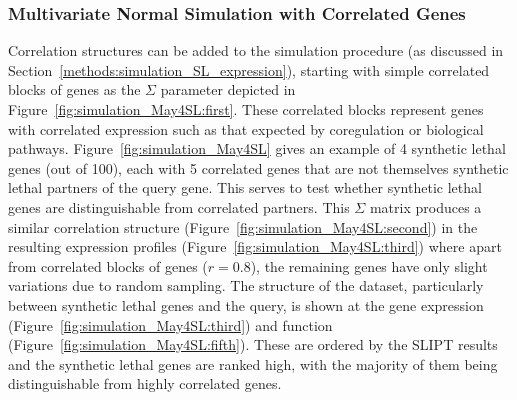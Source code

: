 \FloatBarrier

\subsubsection{Multivariate Normal Simulation with Correlated Genes} \label{chapt2:simulation_mvtnorm_cor}

Correlation structures can be added to the simulation procedure (as discussed in Section~\ref{methods:simulation_SL_expression}), starting with simple correlated blocks of genes as the $\Sigma$ parameter depicted in Figure~\ref{fig:simulation_May4SL:first}. These correlated blocks represent genes with correlated expression such as that expected by coregulation or biological pathways. Figure~\ref{fig:simulation_May4SL} gives an example of 4 synthetic lethal genes (out of 100), each with 5 correlated genes that are not themselves synthetic lethal partners of the query gene. This serves to test whether synthetic lethal genes are distinguishable from correlated partners. This $\Sigma$ matrix produces a similar correlation structure (Figure~\ref{fig:simulation_May4SL:second}) in the resulting expression profiles (Figure~\ref{fig:simulation_May4SL:third}) where apart from correlated blocks of genes ($r = 0.8$), the remaining genes have only slight variations due to random sampling. The structure of the dataset, particularly between synthetic lethal genes and the query, is shown at the gene expression (Figure~\ref{fig:simulation_May4SL:third}) and function (Figure~\ref{fig:simulation_May4SL:fifth}). These are ordered by the \gls{SLIPT} results and the synthetic lethal genes are ranked high, with the majority of them being distinguishable from highly correlated genes.

